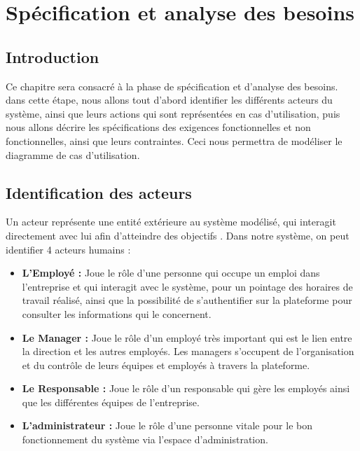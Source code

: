 \chapter{Spécification et analyse des besoins
}
\renewcommand{\headrulewidth}{1pt}


\section{Introduction}
Ce chapitre sera consacré à la phase de spécification et d’analyse des besoins.
dans cette étape, nous allons tout d’abord identifier les différents acteurs du
système, ainsi que leurs actions qui sont représentées en cas d’utilisation,
puis nous allons décrire les spécifications des exigences fonctionnelles et non
fonctionnelles, ainsi que leurs contraintes. Ceci nous permettra de modéliser le
diagramme de cas d’utilisation. 

\section{Identification des acteurs}
Un acteur représente une entité extérieure au système modélisé, qui interagit
directement avec lui afin d’atteindre des objectifs \cite{4}. Dans notre
système, on peut identifier 4 acteurs humains :
    
    
\begin{itemize}
    \item[\textbullet] \textbf{L’Employé :} Joue le rôle d’une personne qui
        occupe un emploi dans l’entreprise et qui interagit avec le système,
        pour un pointage des horaires de travail réalisé, ainsi que la
        possibilité de s’authentifier sur la plateforme pour consulter les
        informations qui le concernent.
    \item[\textbullet] \textbf{Le Manager :} Joue le rôle d’un employé très
        important qui est le lien entre la direction et les autres employés. Les
        managers s’occupent de l’organisation et du contrôle de leurs équipes et
        employés à travers la plateforme.
    \item[\textbullet] \textbf{Le Responsable :} Joue le rôle d’un responsable
        qui gère les employés ainsi que les différentes équipes de l’entreprise.
    \item[\textbullet] \textbf{L’administrateur :} Joue le rôle d’une personne
        vitale pour le bon fonctionnement du système via l’espace
        d’administration.
\end{itemize}
    
